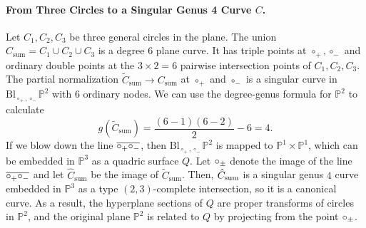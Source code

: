\documentclass[11pt,a4paper]{article}
\newcommand{\PP}{\mathbb{P}}
\theoremstyle{mytheoremstyle}
\theoremstyle{mydefinitionstyle}
\begin{document}
\paragraph{From Three Circles to a Singular Genus 4 Curve $C$.} Let $C_1, C_2, C_3$ be three general circles in the plane. The union $C_\text{sum} = C_1 \cup C_2 \cup C_3$ is a degree 6 plane curve. It has triple points at $\circ_+, \circ_-$ and ordinary double points at the $3 \times 2 = 6$ pairwise intersection points of $C_1, C_2, C_3$. The partial normalization $\widetilde{C}_\text{sum}\to C_\text{sum}$ at $\circ_+$ and $\circ_-$ is a singular curve in $\mathrm{Bl}_{\circ_+,\circ_-}\PP^2$ with $6$ ordinary nodes. We can use the degree-genus formula for $\PP^2$ to calculate $$g(\widetilde{C}_\text{sum}) = \frac{(6-1)(6-2)}{2} - 6 = 4.$$ If we blow down the line $\overline{\circ_+\circ_-}$, then $\mathrm{Bl}_{\circ_+,\circ_-}\PP^2$ is mapped to $\PP^1\times \PP^1$, which can be embedded in $\PP^3$ as a quadric surface $Q$. Let $\circ_{\pm}$ denote the image of the line $\overline{\circ_+\circ_-}$ and let $\hat{C}_\text{sum}$ be the image of $\widetilde{C}_\text{sum}$. Then, $\Hat{C}_\text{sum}$ is a singular genus $4$ curve embedded in $\PP^3$ as a type $(2,3)$-complete intersection, so it is a canonical curve. As a result, the hyperplane sections of $Q$ are proper transforms of circles in $\PP^2$, and the original plane $\PP^2$ is related to $Q$ by projecting from the point $\circ_{\pm}$. 
\end{document}
